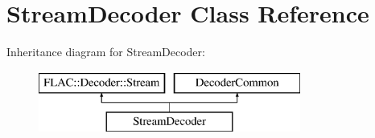 \hypertarget{class_stream_decoder}{}\section{Stream\+Decoder Class Reference}
\label{class_stream_decoder}
Inheritance diagram for Stream\+Decoder\+:\begin{figure}[H]
\begin{center}
\leavevmode
\includegraphics[height=2.000000cm]{class_stream_decoder}
\end{center}
\end{figure}

